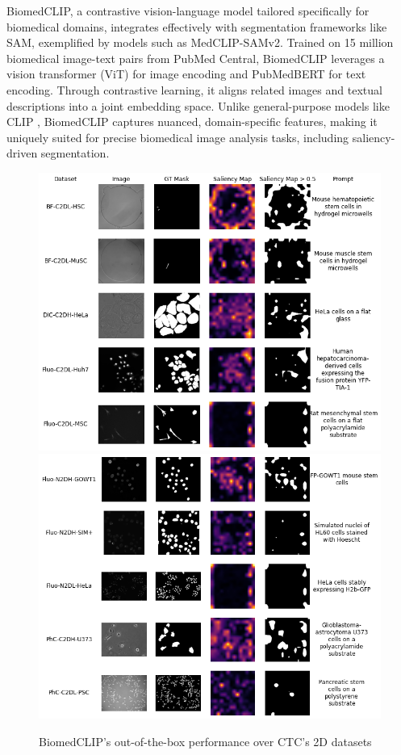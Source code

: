 \documentclass[./dissertation.tex]{subfiles}
\begin{document}

BiomedCLIP, a contrastive vision-language model tailored specifically for biomedical domains, integrates effectively with segmentation frameworks like SAM, exemplified by models such as MedCLIP-SAMv2. Trained on 15 million biomedical image-text pairs from PubMed Central, BiomedCLIP leverages a vision transformer (ViT) for image encoding and PubMedBERT \cite{gu2021domain} for text encoding. Through contrastive learning, it aligns related images and textual descriptions into a joint embedding space. Unlike general-purpose models like CLIP \cite{radford2021learning}, BiomedCLIP captures nuanced, domain-specific features, making it uniquely suited for precise biomedical image analysis tasks, including saliency-driven segmentation.

\begin{figure}[h]
    \centering\includegraphics[width=.48\textwidth]{figures/sam/untuned1.png}
    \centering\includegraphics[width=.48\textwidth]{figures/sam/untuned2.png}
    \caption{BiomedCLIP's out-of-the-box performance over CTC's 2D datasets}
    \label{fig:untuned}
\end{figure}
\end{document}
